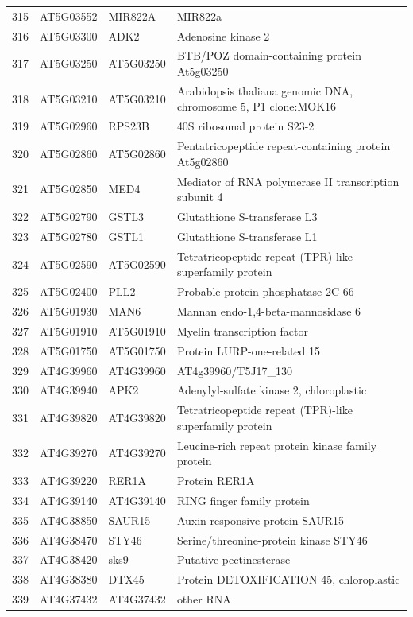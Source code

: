 \documentclass[11pt]{article}
\begin{document}
\begin{center}
\begin{tabular}{rlll}
315 & AT5G03552 & MIR822A & MIR822a\\
316 & AT5G03300 & ADK2 & Adenosine kinase 2\\
317 & AT5G03250 & AT5G03250 & BTB/POZ domain-containing protein At5g03250\\
318 & AT5G03210 & AT5G03210 & Arabidopsis thaliana genomic DNA, chromosome 5, P1 clone:MOK16\\
319 & AT5G02960 & RPS23B & 40S ribosomal protein S23-2\\
320 & AT5G02860 & AT5G02860 & Pentatricopeptide repeat-containing protein At5g02860\\
321 & AT5G02850 & MED4 & Mediator of RNA polymerase II transcription subunit 4\\
322 & AT5G02790 & GSTL3 & Glutathione S-transferase L3\\
323 & AT5G02780 & GSTL1 & Glutathione S-transferase L1\\
324 & AT5G02590 & AT5G02590 & Tetratricopeptide repeat (TPR)-like superfamily protein\\
325 & AT5G02400 & PLL2 & Probable protein phosphatase 2C 66\\
326 & AT5G01930 & MAN6 & Mannan endo-1,4-beta-mannosidase 6\\
327 & AT5G01910 & AT5G01910 & Myelin transcription factor\\
328 & AT5G01750 & AT5G01750 & Protein LURP-one-related 15\\
329 & AT4G39960 & AT4G39960 & AT4g39960/T5J17\_130\\
330 & AT4G39940 & APK2 & Adenylyl-sulfate kinase 2, chloroplastic\\
331 & AT4G39820 & AT4G39820 & Tetratricopeptide repeat (TPR)-like superfamily protein\\
332 & AT4G39270 & AT4G39270 & Leucine-rich repeat protein kinase family protein\\
333 & AT4G39220 & RER1A & Protein RER1A\\
334 & AT4G39140 & AT4G39140 & RING finger family protein\\
335 & AT4G38850 & SAUR15 & Auxin-responsive protein SAUR15\\
336 & AT4G38470 & STY46 & Serine/threonine-protein kinase STY46\\
337 & AT4G38420 & sks9 & Putative pectinesterase\\
338 & AT4G38380 & DTX45 & Protein DETOXIFICATION 45, chloroplastic\\
339 & AT4G37432 & AT4G37432 & other RNA\\

\end{tabular}
\end{center}
\end{document}
